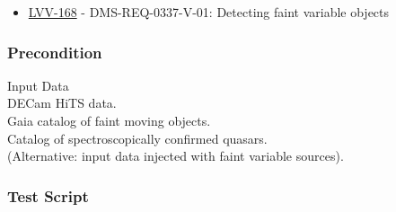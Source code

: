 \begin{itemize}
\tightlist
\item
  \href{https://jira.lsstcorp.org/browse/LVV-168}{LVV-168} -
  DMS-REQ-0337-V-01: Detecting faint variable objects
\end{itemize}

\hypertarget{precondition-10}{%
\subsubsection{Precondition}\label{precondition-10}}

Input Data\\
DECam HiTS data.\\
Gaia catalog of faint moving objects.\\
Catalog of spectroscopically confirmed quasars.\\
(Alternative: input data injected with faint variable sources).

\hypertarget{test-script-57}{%
\subsubsection{Test Script}\label{test-script-57}}

